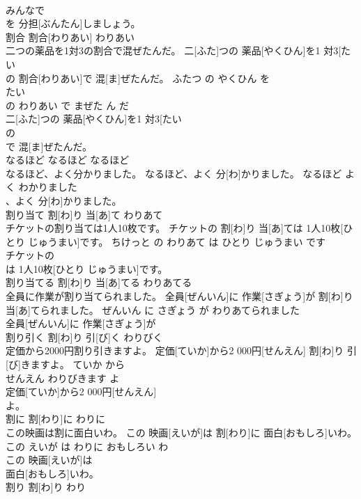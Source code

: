 \documentclass[8pt]{extreport}
\begin{document}
\begin{CJK}{UTF8}{min}
\\	みんなで
\\	を 分担[ぶんたん]しましょう。			
\\	割合	割合[わりあい]	わりあい	
\\	二つの薬品を1対3の割合で混ぜたんだ。	二[ふた]つの 薬品[やくひん]を1 対3[たい 
\\	の 割合[わりあい]で 混[ま]ぜたんだ。	ふたつ の やくひん を 
\\	たい 
\\	の わりあい で まぜた ん だ	
\\	二[ふた]つの 薬品[やくひん]を1 対3[たい 
\\	の
\\	で 混[ま]ぜたんだ。			
\\	なるほど	なるほど	なるほど	
\\	なるほど、よく分かりました。	なるほど、よく 分[わ]かりました。	なるほど よく わかりました	
\\	、よく 分[わ]かりました。			
\\	割り当て	割[わ]り 当[あ]て	わりあて	
\\	チケットの割り当ては1人10枚です。	チケットの 割[わ]り 当[あ]ては 1人10枚[ひとり じゅうまい]です。	ちけっと の わりあて は ひとり じゅうまい です	
\\	チケットの
\\	は 1人10枚[ひとり じゅうまい]です。			
\\	割り当てる	割[わ]り 当[あ]てる	わりあてる	
\\	全員に作業が割り当てられました。	全員[ぜんいん]に 作業[さぎょう]が 割[わ]り 当[あ]てられました。	ぜんいん に さぎょう が わりあてられました	
\\	全員[ぜんいん]に 作業[さぎょう]が
\\	割り引く	割[わ]り 引[び]く	わりびく	
\\	定価から2000円割り引きますよ。	定価[ていか]から2 000円[せんえん] 割[わ]り 引[び]きますよ。	ていか から 
\\	せんえん わりびきます よ	
\\	定価[ていか]から2 000円[せんえん]
\\	よ。			
\\	割に	割[わり]に	わりに	
\\	この映画は割に面白いわ。	この 映画[えいが]は 割[わり]に 面白[おもしろ]いわ。	この えいが は わりに おもしろい わ	
\\	この 映画[えいが]は
\\	面白[おもしろ]いわ。			
\\	割り	割[わ]り	わり	

\end{CJK}
\end{document}
